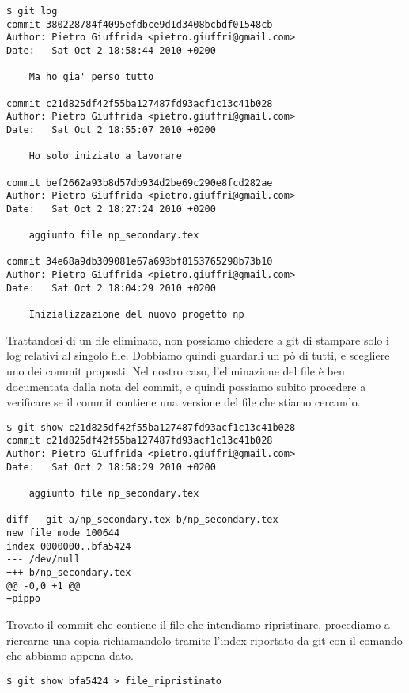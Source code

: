 \documentclass{article}
\begin{document}
\begin{lstlisting}
$ git log
commit 380228784f4095efdbce9d1d3408bcbdf01548cb
Author: Pietro Giuffrida <pietro.giuffri@gmail.com>
Date:   Sat Oct 2 18:58:44 2010 +0200

    Ma ho gia' perso tutto

commit c21d825df42f55ba127487fd93acf1c13c41b028
Author: Pietro Giuffrida <pietro.giuffri@gmail.com>
Date:   Sat Oct 2 18:55:07 2010 +0200

    Ho solo iniziato a lavorare

commit bef2662a93b8d57db934d2be69c290e8fcd282ae
Author: Pietro Giuffrida <pietro.giuffri@gmail.com>
Date:   Sat Oct 2 18:27:24 2010 +0200

    aggiunto file np_secondary.tex

commit 34e68a9db309081e67a693bf8153765298b73b10
Author: Pietro Giuffrida <pietro.giuffri@gmail.com>
Date:   Sat Oct 2 18:04:29 2010 +0200

    Inizializzazione del nuovo progetto np
\end{lstlisting}

Trattandosi di un file eliminato, non possiamo chiedere a git di stampare solo i
log relativi al singolo file. Dobbiamo quindi guardarli un pò di tutti, e
scegliere uno dei commit proposti. Nel nostro caso, l'eliminazione del file è
ben documentata dalla nota del commit, e quindi possiamo subito procedere a
verificare se il commit contiene una versione del file che stiamo cercando.

\begin{lstlisting}
$ git show c21d825df42f55ba127487fd93acf1c13c41b028
commit c21d825df42f55ba127487fd93acf1c13c41b028
Author: Pietro Giuffrida <pietro.giuffri@gmail.com>
Date:   Sat Oct 2 18:58:29 2010 +0200

    aggiunto file np_secondary.tex

diff --git a/np_secondary.tex b/np_secondary.tex
new file mode 100644
index 0000000..bfa5424
--- /dev/null
+++ b/np_secondary.tex
@@ -0,0 +1 @@
+pippo
\end{lstlisting}

Trovato il commit che contiene il file che intendiamo ripristinare, procediamo
a ricrearne una copia richiamandolo tramite l'index riportato da git con il
comando che abbiamo appena dato.

\begin{lstlisting}
$ git show bfa5424 > file_ripristinato
\end{lstlisting}
\end{document}
